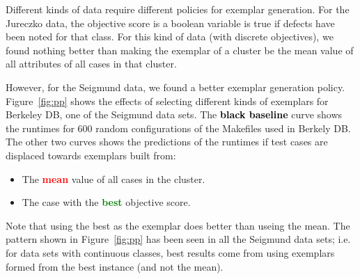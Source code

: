 \documentclass[conference]{IEEEtran}
\newcommand{\bi}{\begin{itemize}}
\newcommand{\ei}{\end{itemize}}
\newcommand{\fig}[1]{Figure~\ref{fig:#1}}
\begin{document}
Different kinds of data require
different policies for exemplar generation.
For the Jureczko data, the objective score
is a boolean variable is true if defects have been noted
for that class.  For this kind of data (with discrete objectives),
we found nothing better than  making the exemplar of a cluster be the mean
value of all attributes of all cases in that cluster.

However, for the Seigmund data, we found a better exemplar generation policy.
\fig{pp} shows the effects of selecting different kinds of exemplars for 
Berkeley DB, one of the Seigmund data sets.
The \textcolor{black}{\bf black baseline} curve  shows the runtimes for 600 random configurations
of the Makefiles used in Berkely DB. The other two curves shows the predictions of the runtimes if test cases are displaced towards exemplars
  built from:
\bi
\item The \textcolor{red}{\bf   mean}    value of all cases in the  cluster.
\item The  case with the \textcolor{green}{\bf  best}  objective score. 
\ei
Note that using the best as the exemplar does better than useing the mean.
The pattern shown in \fig{pp} has been seen in all the Seigmund data sets;
i.e. for data sets with continuous classes,
best results come from using exemplars formed from the best instance (and not the mean). 

  
  
\end{document}
